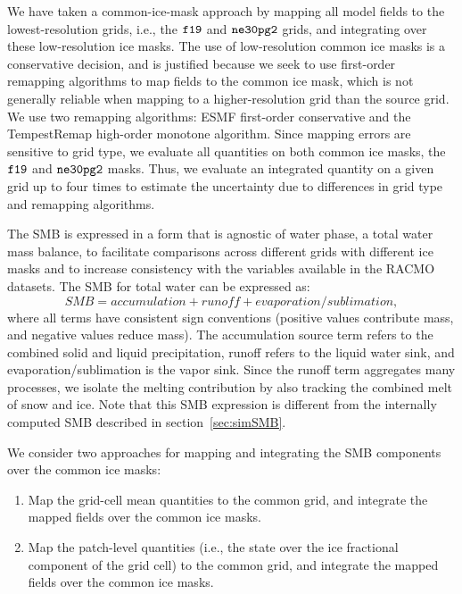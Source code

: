 \documentclass[draft]{agujournal2019}
\begin{document}
We have taken a common-ice-mask approach by mapping all model fields to the lowest-resolution grids, i.e., the $\tt f19$ and $\tt ne30pg2$ grids, and integrating over these low-resolution ice masks. The use of low-resolution common ice masks is a conservative decision, and is justified because we seek to use first-order remapping algorithms to map fields to the common ice mask, which is not generally reliable when mapping to a higher-resolution grid than the source grid. We use two remapping algorithms: ESMF first-order conservative and the TempestRemap \cite{TempestRemap} high-order monotone algorithm. Since mapping errors are sensitive to grid type, we evaluate all quantities on both common ice masks, the $\tt f19$ and $\tt ne30pg2$ masks. Thus, we evaluate an integrated quantity on a given grid up to four times to estimate the uncertainty due to differences in grid type and remapping algorithms.

The SMB is expressed in a form that is agnostic of water phase, a total water mass balance, to facilitate comparisons across different grids with different ice masks and to increase consistency with the variables available in the RACMO datasets. The SMB for total water can be expressed as:
\begin{equation}
SMB = accumulation + runoff + evaporation/sublimation, \label{eq:SMB}
\end{equation}
where all terms have consistent sign conventions (positive values contribute mass, and negative values reduce mass). The accumulation source term refers to the combined solid and liquid precipitation, runoff refers to the liquid water sink, and evaporation/sublimation is the vapor sink. Since the runoff term aggregates many processes, we isolate the melting contribution by also tracking the combined melt of snow and ice. Note that this SMB expression is different from the internally computed SMB described in section~\ref{sec:simSMB}.

We consider two approaches for mapping and integrating the SMB components over the common ice masks:
\begin{enumerate}
\item Map the grid-cell mean quantities to the common grid, and integrate the mapped fields over the common ice masks. \label{lbl:label1}
\item Map the patch-level quantities (i.e., the state over the ice fractional component of the grid cell) to the common grid, and integrate the mapped fields over the common ice masks. \label{lbl:label2}
\end{enumerate}
\end{document}
